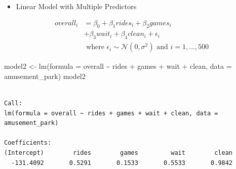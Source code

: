 \documentclass[
  ignorenonframetext,
]{beamer}
\newenvironment{Shaded}{\begin{snugshade}}{\end{snugshade}}
\newcommand{\AttributeTok}[1]{\textcolor[rgb]{0.40,0.45,0.13}{#1}}
\newcommand{\FunctionTok}[1]{\textcolor[rgb]{0.28,0.35,0.67}{#1}}
\newcommand{\NormalTok}[1]{\textcolor[rgb]{0.00,0.23,0.31}{#1}}
\newcommand{\OtherTok}[1]{\textcolor[rgb]{0.00,0.23,0.31}{#1}}
\newcommand{\SpecialCharTok}[1]{\textcolor[rgb]{0.37,0.37,0.37}{#1}}
\providecommand{\tightlist}{%
  \setlength{\itemsep}{0pt}\setlength{\parskip}{0pt}}\usepackage{longtable,booktabs,array}
\begin{document}
\begin{frame}[fragile]{}
\label{section-18}
\begin{itemize}
\tightlist
\item
  Linear Model with Multiple Predictors
\end{itemize}

\[\begin{split}
   overall_{i} & = \beta_0 + \beta_1 rides_i + \beta_2 games_i \\
   & + \beta_3 wait_i + \beta_4 clean_i + \epsilon_i \\
   & \text{ where } \epsilon_i \sim \mathcal{N}(0, \sigma^2) \text{ and } i = 1, \ldots, 500
   \end{split}\]

\tiny

\begin{Shaded}
\begin{Highlighting}[]
\NormalTok{model2 }\OtherTok{\textless{}{-}} \FunctionTok{lm}\NormalTok{(}\AttributeTok{formula =}\NormalTok{ overall }\SpecialCharTok{\textasciitilde{}}\NormalTok{ rides }\SpecialCharTok{+}\NormalTok{ games }\SpecialCharTok{+}\NormalTok{ wait }\SpecialCharTok{+}\NormalTok{ clean, }
             \AttributeTok{data =}\NormalTok{ amusement\_park)}
\NormalTok{model2}
\end{Highlighting}
\end{Shaded}

\begin{verbatim}

Call:
lm(formula = overall ~ rides + games + wait + clean, data = amusement_park)

Coefficients:
(Intercept)        rides        games         wait        clean  
  -131.4092       0.5291       0.1533       0.5533       0.9842  
\end{verbatim}
\end{frame}
\end{document}
